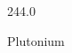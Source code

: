 \documentclass[12pt]{article}
\begin{document}
\hfill{}
\vfill
\begin{center}
  {\fontsize{50}{60}
  }

  \vspace{1em}

  244.0

Plutonium
\end{center}
\vfill
\end{document}
